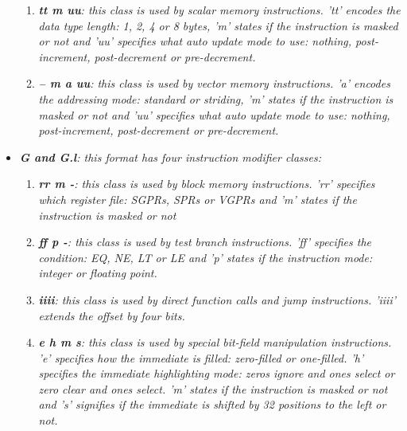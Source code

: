 \begin{itemize}
                    \begin{enumerate}

                        \item \textit{\textbf{tt m uu}: this class is used by scalar memory instructions. 'tt' encodes the data type length: 1, 2, 4 or 8 bytes, 'm' states if the instruction is masked or not and 'uu' specifies what auto update mode to use: nothing, post-increment, post-decrement or pre-decrement.}

                        \item \textit{\textbf{-- m a uu}: this class is used by vector memory instructions. 'a' encodes the addressing mode: standard or striding, 'm' states if the instruction is masked or not and 'uu' specifies what auto update mode to use: nothing, post-increment, post-decrement or pre-decrement.}

                    \end{enumerate}

                \item \textit{\textbf{G and G.l}: this format has four instruction modifier classes:}

                    \begin{enumerate}

                        \item \textit{\textbf{rr m -}: this class is used by block memory instructions. 'rr' specifies which register file: SGPRs, SPRs or VGPRs and 'm' states if the instruction is masked or not}

                        \item \textit{\textbf{ff p -}: this class is used by test branch instructions. 'ff' specifies the condition: EQ, NE, LT or LE and 'p' states if the instruction mode: integer or floating point.}

                        \item \textit{\textbf{iiii}: this class is used by direct function calls and jump instructions. 'iiii' extends the offset by four bits.}

                        \item \textit{\textbf{e h m s}: this class is used by special bit-field manipulation instructions. 'e' specifies how the immediate is filled: zero-filled or one-filled. 'h' specifies the immediate highlighting mode: zeros ignore and ones select or zero clear and ones select. 'm' states if the instruction is masked or not and 's' signifies if the immediate is shifted by 32 positions to the left or not.}


\end{enumerate}
\end{itemize}
